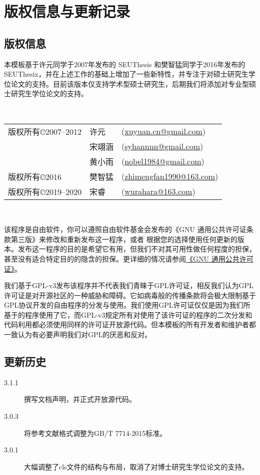 \chapter{版权信息与更新记录}
\label{chp:version_license}

\section{版权信息}

本模板基于许元同学于2007年发布的 SEUThesis 和樊智猛同学于2016年发布的 SEUThesix，并在上述工作的基础上增加了一些新特性，并专注于对硕士研究生学位论文的支持。目前该版本仅支持学术型硕士研究生，后期我们将添加对专业型硕士研究生学位论文的支持。

~

\begin{tabular}{lll}
版权所有\copyright 2007--2012    & 许元      &(\url{xuyuan.cn@gmail.com})\\
                                & 宋翊涵    &(\url{syhannnn@gmail.com})\\
                                & 黄小雨   & (\url{nobel1984@gmail.com})\\
版权所有\copyright 2016          & 樊智猛   &(\url{zhimengfan1990@163.com})\\
版权所有\copyright 2019--2020    & 宋睿       &(\url{wurahara@163.com})
\end{tabular}

~

该程序是自由软件，你可以遵照自由软件基金会发布的《GNU 通用公共许可证条款第三版》来修改和重新发布这一程序，或者 根据您的选择使用任何更新的版本。发布这一程序的目的是希望它有用，但我们不对其可用性做任何程度的担保，甚至没有适合特定目的的隐含的担保。更详细的情况请参阅\href{http://www.gnu.org/licenses/gpl.html}{《GNU 通用公共许可证》}。

我们基于GPL-v3发布该程序并不代表我们青睐于GPL许可证，相反我们认为GPL许可证是对开源社区的一种威胁和障碍。它如病毒般的传播条款将会极大限制基于GPL协议开发的自由程序的分发与使用。我们使用GPL许可证仅仅是因为我们所基于的程序使用了它，而GPL-v3规定所有对使用了该许可证的程序的二次分发和代码利用都必须使用同样的许可证开放源代码。但本模板的所有开发者和维护者都一致认为有必要声明我们对GPL的厌恶和反对。

\section{更新历史}

\begin{description}
  \item[3.1.1] 撰写文档声明，并正式开放源代码。
  \item[3.0.3] 将参考文献格式调整为GB/T 7714-2015标准。
  \item[3.0.1] 大幅调整了cls文件的结构与布局，取消了对博士研究生学位论文的支持。
\end{description}
